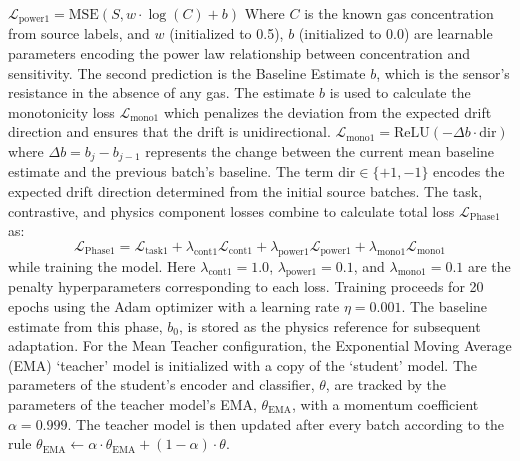 \documentclass{IEEE_lsens}
\begin{document}
$
 \mathcal{L}_{\text{power1}} = \text{MSE}(S, w \cdot \log(C) + b)
$
Where $C$ is the known gas concentration from source labels, and $w$ (initialized to 0.5), $b$ (initialized to 0.0) are learnable parameters encoding the power law relationship between concentration and sensitivity. The second prediction is the Baseline Estimate $b$, which is the sensor's resistance in the absence of any gas. The estimate $b$ is used to calculate the monotonicity loss $\mathcal{L}_\text{mono1}$ which penalizes the deviation from the expected drift direction and ensures that the drift is unidirectional.
$
\mathcal{L}_{\text{mono1}} = \text{ReLU}(-\Delta b \cdot \text{dir})
$
 where $\Delta b = b_j - b_{j-1}$ represents the change between the current mean baseline estimate and the previous batch's baseline. The term $\text{dir} \in \{+1, -1\}$ encodes the expected drift direction determined from the initial source batches\cite{vergara2012chemical}.
The task, contrastive, and physics component losses combine to calculate total loss $\mathcal{L}_{\text{Phase1}}$ as:
\begin{equation}
 \mathcal{L}_{\text{Phase1}} = \mathcal{L}_{\text{task1}} + \lambda_{\text{cont1}} \mathcal{L}_{\text{cont1}} + \lambda_{\text{power1}} \mathcal{L}_{\text{power1}} + \lambda_{\text{mono1}} \mathcal{L}_{\text{mono1}}
\end{equation}
while training the model. Here $\lambda_{\text{cont1}} = 1.0$, $\lambda_{\text{power1}} = 0.1$, and $\lambda_{\text{mono1}} = 0.1$ are the penalty hyperparameters corresponding to each loss. Training proceeds for 20 epochs using the Adam optimizer with a learning rate $\eta = 0.001$. The baseline estimate from this phase, $b_0$, is stored as the physics reference for subsequent adaptation.
For the Mean Teacher configuration, the Exponential Moving Average (EMA) `teacher' model is initialized with a copy of the `student' model. The parameters of the student's encoder and classifier, $\theta$, are tracked by the parameters of the teacher model's EMA, $\theta_{\text{EMA}}$, with a momentum coefficient $\alpha = 0.999$. The teacher model is then updated after every batch according to the rule $\theta_{\text{EMA}} \leftarrow \alpha \cdot \theta_{\text{EMA}} + (1 - \alpha) \cdot \theta$.
\end{document}
